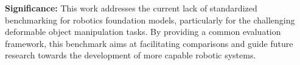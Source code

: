 \textbf{Significance:} This work addresses the current lack of standardized benchmarking for robotics foundation models, particularly for the challenging deformable object manipulation tasks. By providing a common evaluation framework, this benchmark aims at facilitating comparisons and guide future research towards the development of more capable robotic systems.